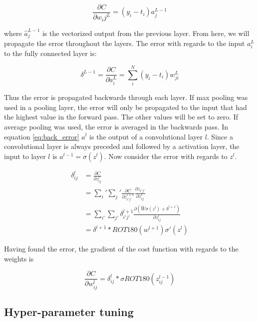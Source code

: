 \documentclass[thesis.tex]{subfiles}
\begin{document}
\begin{equation}
   \frac{\partial C}{\partial w_ij^L} = (y_i - t_i)a_j^{L-1}
\end{equation}

where $\hat{a}_{j}^{L-1}$ is the vectorized output from the previous layer. From here, we will propagate the error throughout the layers. The error with regards to the input $a_i^L$ to the fully connected layer is:

\begin{equation} %
  \delta^{L-1} = \frac{\partial C}{\partial a_i^L} = \sum_i^N (y_i - t_i)w_{ji}^{L}
  \label{eq:back_error}
\end{equation}

Thus the error is propagated backwards through each layer. If max pooling was used in a pooling layer, the error will only be propagated to the input that had the highest value in the forward pass. The other values will be set to zero. If average pooling was used, the error is averaged in the backwards pass.
In equation \ref{eq:back_error} $a^l$ is the output of a convolutional layer $l$. Since a convolutional layer is always preceded and followed by a activation layer, the input to layer $l$ is $a^{l-1} = \sigma(z^l)$. Now consider the error with regards to $z^l$.

\begin{equation}
  \begin{aligned}
  \delta_{ij}^l &= \frac{\partial C}{\partial z_{ij}^l} \\
  &= \sum_i' \sum_j' \frac{\partial C}{\partial z_{i'j'}^{l+1}}\frac{\partial z_{i'j'}}{\partial z_{ij}^l} \\
  &= \sum_{i'} \sum_{j'}\delta_{i'j'}^{l+1} \frac{\partial (\hat{W}\sigma(z^l) + b^{l+1})}{\partial z_{ij}^l} \\
  &= \delta^{l+1} * ROT180(w^{l+1})\sigma'(z^l)
  \end{aligned}
\end{equation}

Having found the error, the gradient of the cost function with regards to the weights is

\begin{equation} %
  \frac{\partial C}{\partial w_{ij}^l} = \delta_{ij}^l * \sigma{ROT180(z_{ij}^{l-1})}
\end{equation}



\subsection{Hyper-parameter tuning}
% 
\end{document}
